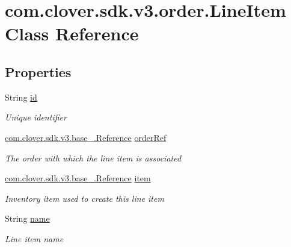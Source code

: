 \hypertarget{classcom_1_1clover_1_1sdk_1_1v3_1_1order_1_1_line_item}{}\section{com.\+clover.\+sdk.\+v3.\+order.\+Line\+Item Class Reference}
\label{classcom_1_1clover_1_1sdk_1_1v3_1_1order_1_1_line_item}
\subsection*{Properties}
\begin{DoxyCompactItemize}
\item 
String \hyperlink{classcom_1_1clover_1_1sdk_1_1v3_1_1order_1_1_line_item_a887dd9857582ed71e9ca16c9e2bb5753}{id}
\begin{DoxyCompactList}\small\item\em Unique identifier \end{DoxyCompactList}\item 
\hyperlink{classcom_1_1clover_1_1sdk_1_1v3_1_1base___1_1_reference}{com.\+clover.\+sdk.\+v3.\+base\+\_\+.\+Reference} \hyperlink{classcom_1_1clover_1_1sdk_1_1v3_1_1order_1_1_line_item_ac67beb7ddb5e2fbc1e74724e616be1e1}{order\+Ref}
\begin{DoxyCompactList}\small\item\em The order with which the line item is associated \end{DoxyCompactList}\item 
\hyperlink{classcom_1_1clover_1_1sdk_1_1v3_1_1base___1_1_reference}{com.\+clover.\+sdk.\+v3.\+base\+\_\+.\+Reference} \hyperlink{classcom_1_1clover_1_1sdk_1_1v3_1_1order_1_1_line_item_aa64477b9aa862583358c5a9c93e74900}{item}
\begin{DoxyCompactList}\small\item\em Inventory item used to create this line item \end{DoxyCompactList}\item 
String \hyperlink{classcom_1_1clover_1_1sdk_1_1v3_1_1order_1_1_line_item_ad97f1e272f7fbe6da7e6d80fae59d53e}{name}
\begin{DoxyCompactList}\small\item\em Line item name \end{DoxyCompactList}\item 

\end{DoxyCompactItemize}
